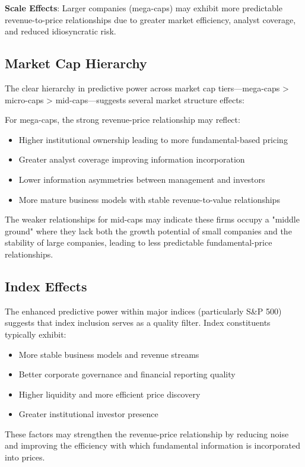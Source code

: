 \documentclass[11pt]{article}
\begin{document}
\textbf{Scale Effects}: Larger companies (mega-caps) may exhibit more predictable revenue-to-price relationships due to greater market efficiency, analyst coverage, and reduced idiosyncratic risk.

\subsection{Market Cap Hierarchy}

The clear hierarchy in predictive power across market cap tiers—mega-caps > micro-caps > mid-caps—suggests several market structure effects:

For mega-caps, the strong revenue-price relationship may reflect:
\begin{itemize}
\item Higher institutional ownership leading to more fundamental-based pricing
\item Greater analyst coverage improving information incorporation
\item Lower information asymmetries between management and investors
\item More mature business models with stable revenue-to-value relationships
\end{itemize}

The weaker relationships for mid-caps may indicate these firms occupy a "middle ground" where they lack both the growth potential of small companies and the stability of large companies, leading to less predictable fundamental-price relationships.

\subsection{Index Effects}

The enhanced predictive power within major indices (particularly S\&P 500) suggests that index inclusion serves as a quality filter. Index constituents typically exhibit:
\begin{itemize}
\item More stable business models and revenue streams
\item Better corporate governance and financial reporting quality  
\item Higher liquidity and more efficient price discovery
\item Greater institutional investor presence
\end{itemize}

These factors may strengthen the revenue-price relationship by reducing noise and improving the efficiency with which fundamental information is incorporated into prices.
\end{document}
